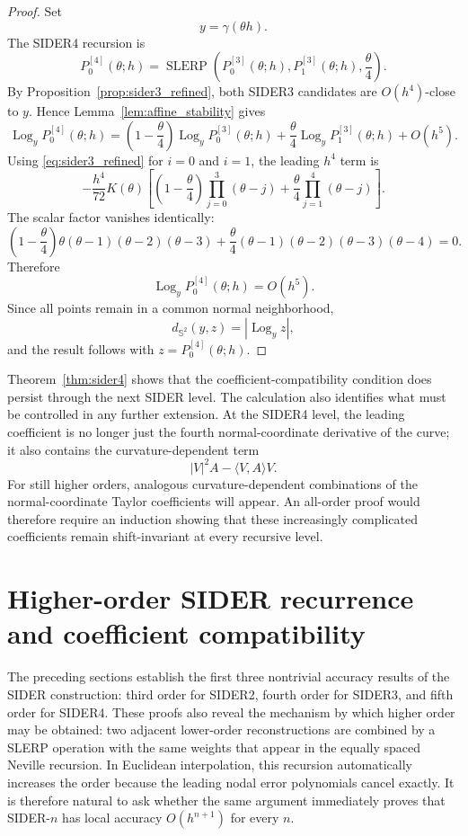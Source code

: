 \documentclass[a4paper,11pt]{article}
\newcommand{\bS}{\mathbb{S}}
\newcommand{\Log}{\operatorname{Log}}
\newcommand{\SLERP}{\operatorname{SLERP}}
\numberwithin{equation}{section}
\begin{document}
\begin{proof}
Set
\[
        y=\gamma(\theta h).
\]
The SIDER4 recursion is
\[
        P_0^{[4]}(\theta;h)
        =
        \SLERP\left(
        P_0^{[3]}(\theta;h),
        P_1^{[3]}(\theta;h),
        \frac{\theta}{4}
        \right).
\]
By Proposition~\ref{prop:sider3_refined}, both SIDER3 candidates are
\(O(h^4)\)-close to \(y\).  Hence Lemma~\ref{lem:affine_stability} gives
\[
\Log_yP_0^{[4]}(\theta;h)
=
\left(1-\frac{\theta}{4}\right)
\Log_yP_0^{[3]}(\theta;h)
+
\frac{\theta}{4}
\Log_yP_1^{[3]}(\theta;h)
+
O(h^5).
\]
Using \eqref{eq:sider3_refined} for \(i=0\) and \(i=1\), the leading
\(h^4\) term is
\[
-\frac{h^4}{72}K(\theta)
\left[
\left(1-\frac{\theta}{4}\right)
\prod_{j=0}^{3}(\theta-j)
+
\frac{\theta}{4}
\prod_{j=1}^{4}(\theta-j)
\right].
\]
The scalar factor vanishes identically:
\[
\left(1-\frac{\theta}{4}\right)
\theta(\theta-1)(\theta-2)(\theta-3)
+
\frac{\theta}{4}
(\theta-1)(\theta-2)(\theta-3)(\theta-4)
=0.
\]
Therefore
\[
        \Log_yP_0^{[4]}(\theta;h)=O(h^5).
\]
Since all points remain in a common normal neighborhood,
\[
        d_{\bS^2}(y,z)=|\Log_yz|,
\]
and the result follows with \(z=P_0^{[4]}(\theta;h)\).
\end{proof}

Theorem~\ref{thm:sider4} shows that the coefficient-compatibility condition
does persist through the next SIDER level.  The calculation also identifies
what must be controlled in any further extension.  At the SIDER4 level, the
leading coefficient is no longer just the fourth normal-coordinate derivative
of the curve; it also contains the curvature-dependent term
\[
        |V|^2A-\langle V,A\rangle V.
\]
For still higher orders, analogous curvature-dependent combinations of the
normal-coordinate Taylor coefficients will appear.  An all-order proof would
therefore require an induction showing that these increasingly complicated
coefficients remain shift-invariant at every recursive level.

\section{Higher-order SIDER recurrence and coefficient compatibility}
\label{sec:higher_order_recurrence}

The preceding sections establish the first three nontrivial accuracy results
of the SIDER construction: third order for SIDER2, fourth order for SIDER3,
and fifth order for SIDER4.  These proofs also reveal the mechanism by which
higher order may be obtained: two adjacent lower-order reconstructions are
combined by a SLERP operation with the same weights that appear in the equally
spaced Neville recursion.  In
Euclidean interpolation, this recursion automatically increases the order
because the leading nodal error polynomials cancel exactly.  It is therefore
natural to ask whether the same argument immediately proves that SIDER-\(n\)
has local accuracy \(O(h^{n+1})\) for every \(n\).
\end{document}
